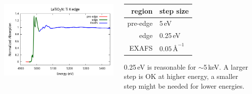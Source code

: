 \documentclass[10pt, xcolor=x11names, compress]{beamer}
\begin{document}
\begin{frame}
  \begin{columns}
    \begin{column}{0.5\linewidth}
      \includegraphics[width=\linewidth]{exp/scan_params.png}
    \end{column}
    \begin{column}{0.5\linewidth}
      \begin{tabular}[h]{rl}
        region & step size\\
        \hline
        \color{Red2}pre-edge & \color{Red2}5\,eV\\
        \color{Green4}edge   & \color{Green4}0.25\,eV\\
        \color{Blue3}EXAFS   & \color{Blue3}$0.05\,\textrm{\AA}^{-1}$\\
      \end{tabular}

      \smallskip

      \small%
      {\color{Green4}0.25\,eV} is reasonable for $\sim$5\,keV.  A
      larger step is OK at higher energy, a smaller step might be
      needed for lower energies.
    \end{column}
  \end{columns}
\end{frame}
\end{document}
